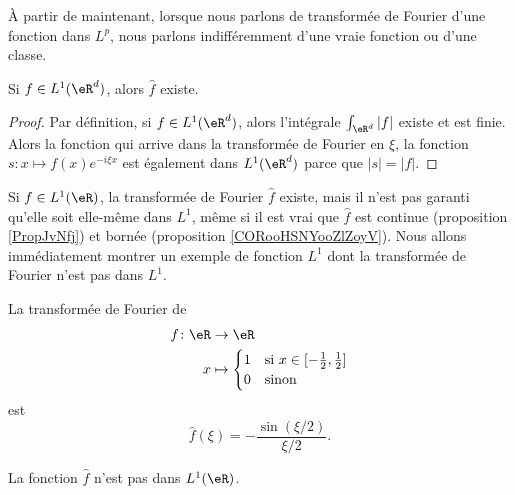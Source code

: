 À partir de maintenant, lorsque nous parlons de transformée de Fourier d'une fonction dans \( L^p\), nous parlons indifféremment d'une vraie fonction ou d'une classe.

\begin{lemma}
	Si \( f\in L^1(\eR^d)\), alors \( \hat f\) existe.
\end{lemma}

\begin{proof}
	Par définition, si \( f\in L^1(\eR^d)\), alors l'intégrale \( \int_{\eR^d}| f |\) existe et est finie. Alors la fonction qui arrive dans la transformée de Fourier en \( \xi\), la fonction \( s\colon x\mapsto f(x) e^{-i\xi x}\) est également dans \( L^1(\eR^d)\) parce que \( | s |=| f |\).
\end{proof}

\begin{normaltext}
	Si \( f\in L^1(\eR)\), la transformée de Fourier \( \hat f\) existe, mais il n'est pas garanti qu'elle soit elle-même dans \( L^1\), même si il est vrai que \( \hat f\) est continue (proposition \ref{PropJvNfj}) et bornée (proposition \ref{CORooHSNYooZlZoyV}). Nous allons immédiatement montrer un exemple de fonction \( L^1\) dont la transformée de Fourier n'est pas dans \( L^1\).
\end{normaltext}

\begin{lemma}       \label{LEMooROPHooOSguhN}
	La transformée de Fourier de
	\begin{equation}
		\begin{aligned}
			f\colon \eR & \to \eR                                                                                             \\
			x           & \mapsto \begin{cases}
				                      1 & \text{si } x\in \mathopen[ -\frac{ 1 }{2} , \frac{ 1 }{2} \mathclose] \\
				                      0 & \text{sinon }
			                      \end{cases}
		\end{aligned}
	\end{equation}
	est
	\begin{equation}
		\hat f(\xi)=-\frac{ \sin(\xi/2) }{ \xi/2 }.
	\end{equation}

	La fonction \( \hat f\) n'est pas dans \( L^1(\eR)\).
\end{lemma}

